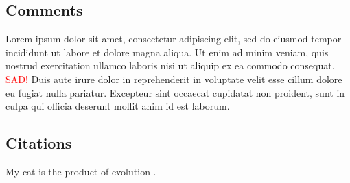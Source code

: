 \documentclass{article}
\newcommand\CD[1]{\todo[color=orange!40]{CD: #1}} %
\begin{document}
	\subsection{Comments}
	
	Lorem ipsum dolor sit amet, consectetur adipiscing elit, sed do eiusmod tempor incididunt ut labore et dolore magna aliqua. 
	Ut enim ad minim veniam, quis nostrud exercitation ullamco laboris nisi ut aliquip ex ea commodo consequat. \textcolor{red}{SAD!}
	Duis aute irure dolor in reprehenderit in voluptate velit esse cillum dolore eu fugiat nulla pariatur. 
	Excepteur sint occaecat cupidatat non proident, sunt in culpa qui officia deserunt mollit anim id est laborum.\CD{go home now}
	
	
	
	\subsection{Citations}
	
	My cat is the product of evolution \cite{darwin1859origin}.
	
	
	
	
	
\end{document}
